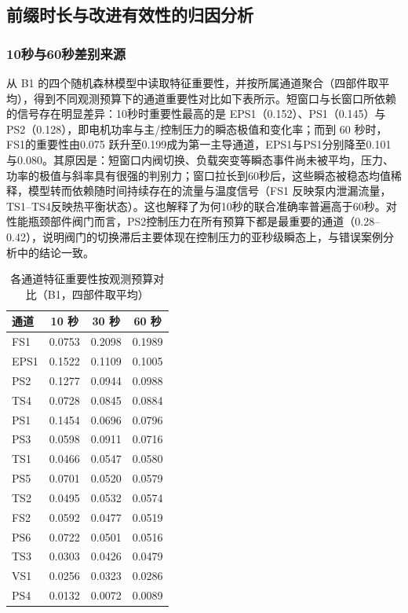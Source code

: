 \documentclass[12pt, a4paper]{ctexart}
\begin{document}
\subsection{前缀时长与改进有效性的归因分析}
\subsubsection{10秒与60秒差别来源}
从 B1 的四个随机森林模型中读取特征重要性，并按所属通道聚合（四部件取平均），得到不同观测预算下的通道重要性对比如下表所示。短窗口与长窗口所依赖的信号存在明显差异：10秒时重要性最高的是 EPS1（0.152）、PS1（0.145）与 PS2（0.128），即电机功率与主/控制压力的瞬态极值和变化率；而到 60 秒时，FS1的重要性由0.075 跃升至0.199成为第一主导通道，EPS1与PS1分别降至0.101 与0.080。其原因是：短窗口内阀切换、负载突变等瞬态事件尚未被平均，压力、功率的极值与斜率具有很强的判别力；窗口拉长到60秒后，这些瞬态被稳态均值稀释，模型转而依赖随时间持续存在的流量与温度信号（FS1 反映泵内泄漏流量，TS1--TS4反映热平衡状态）。这也解释了为何10秒的联合准确率普遍高于60秒。对性能瓶颈部件阀门而言，PS2控制压力在所有预算下都是最重要的通道（0.28--0.42），说明阀门的切换滞后主要体现在控制压力的亚秒级瞬态上，与错误案例分析中的结论一致。

\begin{table}[H]
  \centering
  \caption{各通道特征重要性按观测预算对比（B1，四部件取平均）}
  \label{tab:feat_imp_budget}
  \small
  \begin{tabular}{lccc}
    \toprule
    \textbf{通道} & \textbf{10 秒} & \textbf{30 秒} & \textbf{60 秒} \\
    \midrule
    FS1  & 0.0753 & 0.2098 & 0.1989 \\
    EPS1 & 0.1522 & 0.1109 & 0.1005 \\
    PS2  & 0.1277 & 0.0944 & 0.0988 \\
    TS4  & 0.0728 & 0.0845 & 0.0884 \\
    PS1  & 0.1454 & 0.0696 & 0.0796 \\
    PS3  & 0.0598 & 0.0911 & 0.0716 \\
    TS1  & 0.0466 & 0.0547 & 0.0580 \\
    PS5  & 0.0701 & 0.0520 & 0.0579 \\
    TS2  & 0.0495 & 0.0532 & 0.0574 \\
    FS2  & 0.0592 & 0.0477 & 0.0519 \\
    PS6  & 0.0722 & 0.0501 & 0.0516 \\
    TS3  & 0.0303 & 0.0426 & 0.0479 \\
    VS1  & 0.0256 & 0.0323 & 0.0286 \\
    PS4  & 0.0132 & 0.0072 & 0.0089 \\
    \bottomrule
  \end{tabular}
\end{table}
\end{document}
